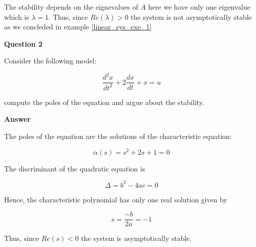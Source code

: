 The stability depends on the eignevalues of $A$ here we have only one eigenvalue which is $\lambda = 1$. Thus, since $Re(\lambda) > 0 $ the system is not asymptotically stable as we concleded in example 
\ref{linear_sys_exe_1}


\textbf{Question 2}

Consider the following model:

\begin{equation}
\frac{d^2x}{dt^2} + 2\frac{dx}{dt} + x  = u \nonumber
\end{equation}

compute the poles of the equation and argue about the stability.


\textbf{Answer}

The poles of the equation are the solutions of the characteristic equation:

\begin{equation}
\alpha(s) = s^2 + 2s +1 =0  \nonumber
\end{equation}

The discriminant of the quadratic equation is

\begin{equation}
\Delta = b^2 - 4ac =0  \nonumber
\end{equation}

Hence, the characteristic polynomial has only one real solution given by

\begin{equation}
s = \frac{-b}{2a} = -1  \nonumber
\end{equation}

Thus, since $Re(s) < 0 $ the system is asymptotically stable.
 



